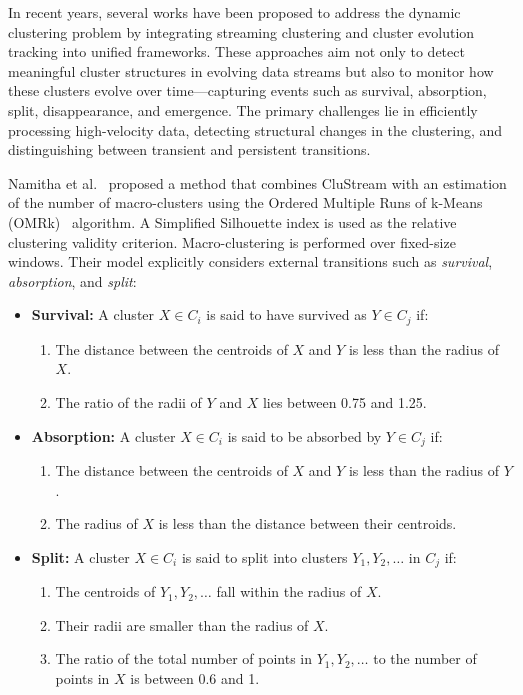 In recent years, several works have been proposed to address the dynamic
clustering problem by integrating streaming clustering and cluster evolution
tracking into unified frameworks. These approaches aim not only to detect
meaningful cluster structures in evolving data streams but also to monitor how
these clusters evolve over time—capturing events such as survival, absorption,
split, disappearance, and emergence. The primary challenges lie in efficiently
processing high-velocity data, detecting structural changes in the clustering,
and distinguishing between transient and persistent transitions.

Namitha et al.~\cite{namitha_dynamic_clustering_1} proposed a method that
combines CluStream with an estimation of the number of macro-clusters using the
Ordered Multiple Runs of k-Means (OMRk)~\cite{omrk} algorithm. A Simplified
Silhouette index is used as the relative clustering validity criterion.
Macro-clustering is performed over fixed-size windows. Their model explicitly
considers external transitions such as \textit{survival}, \textit{absorption},
and \textit{split}:

\begin{itemize}
    \item \textbf{Survival:} A cluster $X \in C_i$ is said to have survived as $Y \in C_j$ if:
          \begin{enumerate}
              \item The distance between the centroids of $X$ and $Y$ is less than the radius of
                    $X$.
              \item The ratio of the radii of $Y$ and $X$ lies between 0.75 and 1.25.
          \end{enumerate}

    \item \textbf{Absorption:} A cluster $X \in C_i$ is said to be absorbed by $Y \in C_j$ if:
          \begin{enumerate}
              \item The distance between the centroids of $X$ and $Y$ is less than the radius of
                    $Y$.
              \item The radius of $X$ is less than the distance between their centroids.
          \end{enumerate}

    \item \textbf{Split:} A cluster $X \in C_i$ is said to split into clusters $Y_1, Y_2, \dots$ in $C_j$ if:
          \begin{enumerate}
              \item The centroids of $Y_1, Y_2, \dots$ fall within the radius of $X$.
              \item Their radii are smaller than the radius of $X$.
              \item The ratio of the total number of points in $Y_1, Y_2, \dots$ to the number of
                    points in $X$ is between 0.6 and 1.
          \end{enumerate}
\end{itemize}

